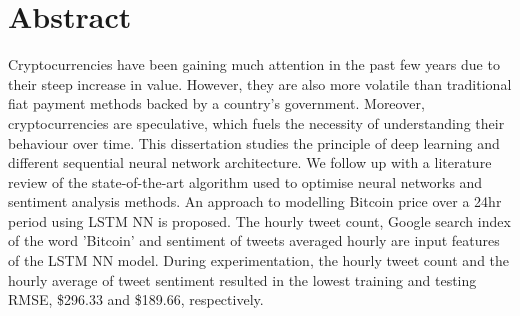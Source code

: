 \documentclass[a4paper,12pt,hidelinks]{report}
\begin{document}
\chapter*{Abstract}
Cryptocurrencies have been gaining much attention in the past few years due to their steep increase in value. However, they are also more volatile than traditional fiat payment methods backed by a country's government. Moreover, cryptocurrencies are speculative, which fuels the necessity of understanding their behaviour over time. This dissertation studies the principle of deep learning and different sequential neural network architecture. We follow up with a literature review of the state-of-the-art algorithm used to optimise neural networks and sentiment analysis methods. An approach to modelling Bitcoin price over a 24hr period using LSTM NN is proposed. The hourly tweet count, Google search index of the word 'Bitcoin' and sentiment of tweets averaged hourly are input features of the LSTM NN model. During experimentation, the hourly tweet count and the hourly average of tweet sentiment resulted in the lowest training and testing RMSE, \$296.33 and \$189.66, respectively.






\end{document}
